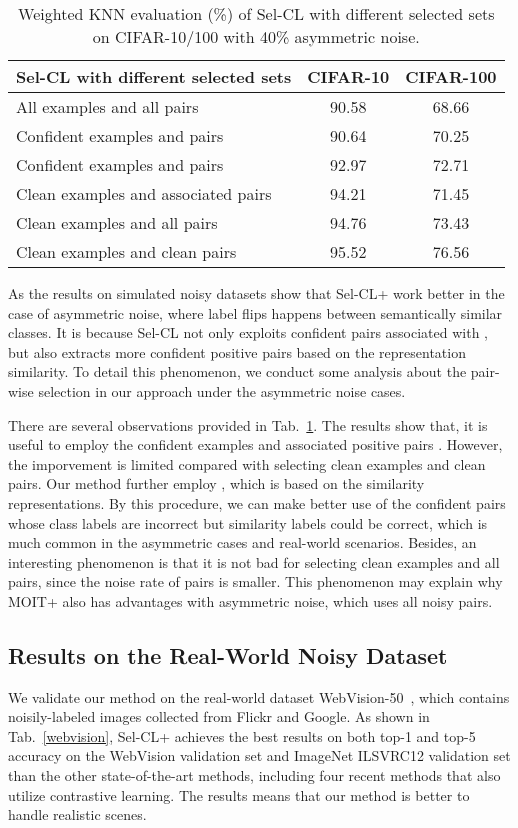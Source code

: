 \documentclass[10pt,twocolumn,letterpaper]{article}
\begin{document}
\begin{table}[t]
	\caption{Weighted KNN evaluation (\%) of Sel-CL with different selected sets on CIFAR-10/100 with 40\% asymmetric noise. }
	\centering
	\footnotesize
	\setlength\tabcolsep{4pt}
	\begin{tabular}{l|c|c}
		\hline
		Sel-CL with different selected sets & CIFAR-10 & CIFAR-100 \\
		\hline  { All examples and all pairs}  & 90.58 & 68.66 \\
		\hline
		{ Confident examples  and pairs  }  & 90.64 & 70.25 \\
		{ Confident examples  and pairs  }  & 92.97 & 72.71 \\
		\hline
		{ Clean examples and associated pairs }  & 94.21 & 71.45 \\
		{ Clean examples and all pairs }    & 94.76 & 73.43 \\		
		{ Clean examples and clean pairs }  & 95.52 & 76.56\\
		\hline
	\end{tabular}
	\label{select}
	\vspace{-5pt}
\end{table}

As the results on simulated noisy datasets show that Sel-CL+ work better in the case of asymmetric noise, where label flips happens between semantically similar classes. It is because Sel-CL not only exploits confident pairs associated with , but also extracts more confident positive pairs based on the representation similarity. To detail this phenomenon, we conduct some analysis about the pair-wise selection in our approach under the asymmetric noise cases. 

There are several observations provided in Tab.~\ref{select}. The results show that, it is useful to employ the confident examples and associated positive pairs . However, the imporvement is limited compared with selecting clean examples and clean pairs. Our method further employ , which is based on the similarity representations. By this procedure, we can make better use of the confident pairs whose class labels are incorrect but similarity labels could be correct, which is much common in the asymmetric cases and real-world scenarios. Besides, an interesting phenomenon is that it is not bad for selecting clean examples and all pairs, since the noise rate of pairs is smaller. This phenomenon may explain why MOIT+ also has advantages with asymmetric noise, which uses all noisy pairs. 


\subsection{Results on the Real-World Noisy Dataset}\label{sec:4.5}
We validate our method on the real-world
dataset WebVision-50~\cite{abs_1708_02862}, which contains noisily-labeled images collected from Flickr and Google. As shown in Tab.~\ref{webvision}, Sel-CL+ achieves the best results on both top-1 and top-5 accuracy on the WebVision validation set and ImageNet ILSVRC12 validation set than the other state-of-the-art methods, including four recent methods that also utilize contrastive learning. The results means that our method is better to handle realistic scenes. 
\end{document}
